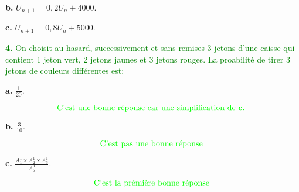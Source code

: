 \documentclass[12pt]{article}
\begin{document}
\textbf{b.} $U_{n+1}=0,2U_{n}+4000$.

\textbf{c.} $U_{n+1}=0,8U_{n}+5000$.

\textcolor{green}{\textbf{4.} On choisit au hasard, successivement et sans remises $3$ jetons d'une caisse qui contient 1 jeton vert, 2 jetons jaunes et 3 jetons rouges. La proabilité de tirer 3 jetons de couleurs différentes est:}

\textbf{a.} $\frac{1}{20}$.

\[\text{\textcolor{green} {C'est une bonne réponse car une simplification de \textbf{c.} }}\]

\textbf{b.} $\frac{3}{10}$.

 \[\text{\textcolor{green} { C'est pas une bonne réponse }}\]

\textbf{c.} $\frac{ A_{1}^{1}\times A_{2}^{1}\times A_{3}^{1}}{ A_{6}^{3} }$.

\[\text{\textcolor{green} {C'est la prémière bonne réponse }}\]
 

\end{document}

